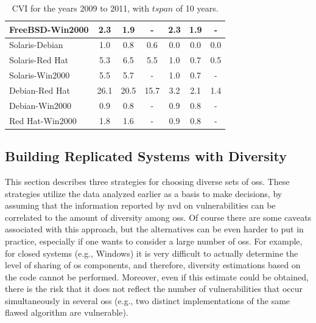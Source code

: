 \begin{table}[!ht]
\begin{center}
{\begin{tabular}{|l|c c c|| c c c |}
FreeBSD-Win2000 & 2.3 & 1.9 & -             & 2.3 & 1.9 & -  \\ \hline
Solaris-Debian  & 1.0 & 0.8 & 0.6           & 0.0 & 0.0 & 0.0  \\
Solaris-Red Hat & 5.3 & 6.5 & 5.5           & 1.0 & 0.7 & 0.5  \\
Solaris-Win2000 & 5.5 & 5.7 & -             & 1.0 & 0.7 & -  \\ \hline
Debian-Red Hat  & 26.1 & 20.5 & 15.7        & 3.2 & 2.1 & 1.4  \\
Debian-Win2000  & 0.9 & 0.8 & -             & 0.9 & 0.8 & -   \\ \hline
Red Hat-Win2000 & 1.8 & 1.6 & -             & 0.9 & 0.8 & -   \\ \hline
\end{tabular}
\caption{CVI for the years 2009 to 2011, with $\mathit{tspan}$ of 10 years.}
\label{tab:cvi-2011-2009}
}
\end{center}
\end{table}



\subsection*{Building Replicated Systems with Diversity}
\label{build_diversity}

This section describes three strategies for choosing diverse sets of \glspl{os}. 
These strategies utilize the data analyzed earlier as a basis to make decisions, by assuming that the information reported by \gls{nvd} on vulnerabilities can be correlated to the amount of diversity among \glspl{os}. 
Of course there are some caveats associated with this approach, but the alternatives can be even harder to put in practice, especially if one wants to consider a large number of \glspl{os}. 
For example, for closed systems (e.g., Windows) it is very difficult to actually determine the level of sharing of \gls{os} components, and therefore, diversity estimations based on the code cannot be performed. Moreover, even if this estimate could be obtained, there is the risk that it does not reflect the number of vulnerabilities that occur simultaneously in several \glspl{os} (e.g., two distinct implementations of the same flawed algorithm are vulnerable).


